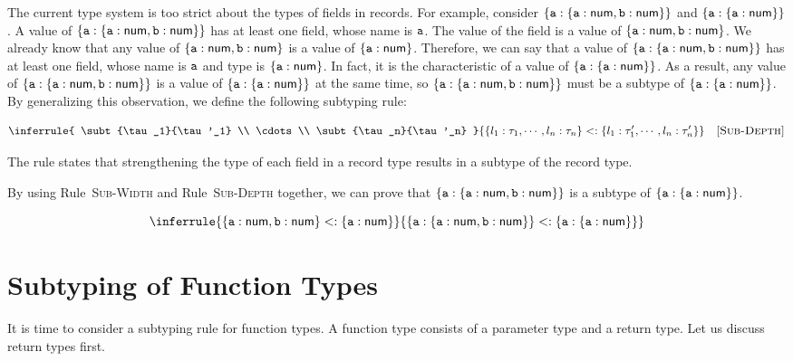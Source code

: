 The current type system is too strict about the types of fields in records.
For example, consider $\{\texttt{a}:\{\texttt{a}:\textsf{num},\texttt{b}:\textsf{num}\}\}$ and
$\{\texttt{a}:\{\texttt{a}:\textsf{num}\}\}$. A value of $\{\texttt{a}:\{\texttt{a}:\textsf{num},\texttt{b}:\textsf{num}\}\}$ has at
least one field, whose name is $\texttt{a}$. The value of the field is a value of
$\{\texttt{a}:\textsf{num},\texttt{b}:\textsf{num}\}$. We already know that any value of
$\{\texttt{a}:\textsf{num},\texttt{b}:\textsf{num}\}$ is a value of $\{\texttt{a}:\textsf{num}\}$. Therefore, we can
say that a value of $\{\texttt{a}:\{\texttt{a}:\textsf{num},\texttt{b}:\textsf{num}\}\}$ has at least one field,
whose name is $\texttt{a}$ and type is $\{\texttt{a}:\textsf{num}\}$. In fact, it is the characteristic of a
value of $\{\texttt{a}:\{\texttt{a}:\textsf{num}\}\}$. As a result, any value of
$\{\texttt{a}:\{\texttt{a}:\textsf{num},\texttt{b}:\textsf{num}\}\}$ is a value of $\{\texttt{a}:\{\texttt{a}:\textsf{num}\}\}$ at the
same time, so $\{\texttt{a}:\{\texttt{a}:\textsf{num},\texttt{b}:\textsf{num}\}\}$ must be a subtype of
$\{\texttt{a}:\{\texttt{a}:\textsf{num}\}\}$. By
generalizing this observation, we define the following subtyping rule:


\[
  \inferrule
  { \subt{\tau_1}{\tau'_1} \\ \cdots \\
    \subt{\tau_n}{\tau'_n} }
  { \subt{\{l_1:\tau_1,\cdots,l_n:\tau_n\}}{\{l_1:\tau'_1,\cdots,l_n:\tau'_n\}} }
  \quad\textsc{[Sub-Depth]}
\]

The rule states that strengthening the type of each field in a record type
results in a subtype of the record type.

By using Rule~\textsc{Sub-Width} and Rule~\textsc{Sub-Depth} together, we can
prove that $\{\texttt{a}:\{\texttt{a}:\textsf{num},\texttt{b}:\textsf{num}\}\}$ is a subtype of
$\{\texttt{a}:\{\texttt{a}:\textsf{num}\}\}$.

\[
  \inferrule
  { \{\ca:\tnum,\cb:\tnum\}<:\{\ca:\tnum\} }
  { \{\ca:\{\ca:\tnum,\cb:\tnum\}\}<:\{\ca:\{\ca:\tnum\}\} }
\]

\section{Subtyping of Function Types}

It is time to consider a subtyping rule for function types. A function type
consists of a parameter type and a return type. Let us discuss
return types first.

